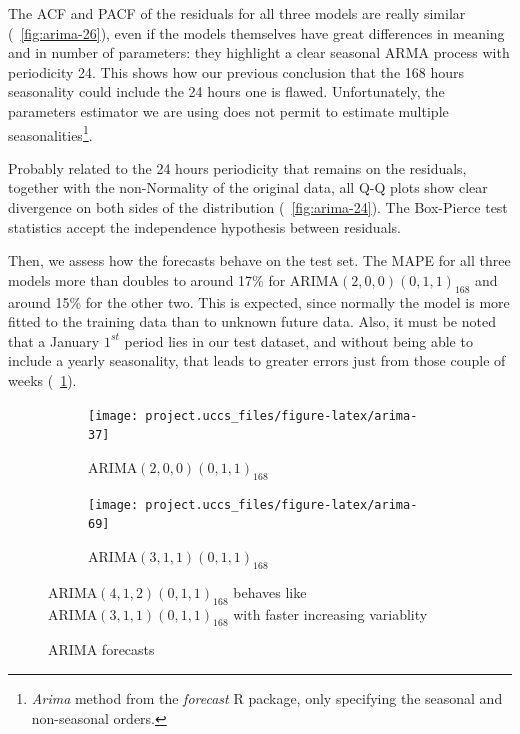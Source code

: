 \documentclass[12pt]{article}
\begin{document}
The ACF and PACF of the residuals for all three models are really similar (\figurename~\ref{fig:arima-26}), even if the models themselves have great differences in meaning and in number of parameters: they highlight a clear seasonal ARMA process with periodicity 24. This shows how our previous conclusion that the 168 hours seasonality could include the 24 hours one is flawed. Unfortunately, the parameters estimator we are using does not permit to estimate multiple seasonalities\footnote{\textit{Arima} method from the \textit{forecast} R package, only specifying the seasonal and non-seasonal orders.}.

Probably related to the 24 hours periodicity that remains on the residuals, together with the non-Normality of the original data, all Q-Q plots show clear divergence on both sides of the distribution (\figurename~\ref{fig:arima-24}). The Box-Pierce test statistics accept the independence hypothesis between residuals.

Then, we assess how the forecasts behave on the test set. The MAPE for all three models more than doubles to around 17\% for $\mathrm{ARIMA}(2,0,0)(0,1,1)_{168}$ and around 15\% for the other two. This is expected, since normally the model is more fitted to the training data than to unknown future data. Also, it must be noted that a January $1^{st}$ period lies in our test dataset, and without being able to include a yearly seasonality, that leads to greater errors just from those couple of weeks (\figurename~\ref{fig:arima-forecast:200011}).

\begin{figure}[h]
	\begin{subfigure}{.5\linewidth}
		\texttt{[image: project.uccs\_files/figure-latex/arima-37]}
		\caption{$\mathrm{ARIMA}(2,0,0)(0,1,1)_{168}$}
		\label{fig:arima-forecast:200011}
	\end{subfigure}
	\begin{subfigure}{.5\linewidth}
		\texttt{[image: project.uccs\_files/figure-latex/arima-69]}
		\caption{$\mathrm{ARIMA}(3,1,1)(0,1,1)_{168}$}
		\label{fig:arima-forecast:412011}
	\end{subfigure}
	\begin{center}
		\caption{ARIMA forecasts}{\footnotesize$\mathrm{ARIMA}(4,1,2)(0,1,1)_{168}$ behaves like $\mathrm{ARIMA}(3,1,1)(0,1,1)_{168}$ with faster increasing variablity}
		\label{fig:arima-forecast}
	\end{center}
\end{figure}
\end{document}
